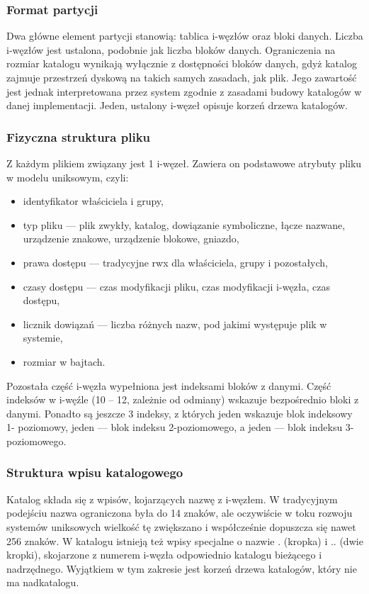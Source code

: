 \documentclass[12pt]{article}
\begin{document}
    \subsubsection{Format partycji}
    Dwa główne element partycji stanowią: tablica i-węzłów oraz bloki danych. Liczba i-węzłów jest ustalona, podobnie jak liczba bloków danych. Ograniczenia na rozmiar katalogu wynikają wyłącznie z dostępności bloków danych, gdyż katalog zajmuje przestrzeń dyskową na takich samych
    zasadach, jak plik. Jego zawartość jest jednak interpretowana przez system zgodnie z zasadami budowy katalogów w danej
    implementacji. Jeden, ustalony i-węzeł opisuje korzeń drzewa katalogów.
    
    \subsubsection{Fizyczna struktura pliku}
    Z każdym plikiem związany jest 1 i-węzeł. Zawiera
    on podstawowe atrybuty pliku w modelu
    uniksowym, czyli:
    \begin{itemize}
        \item identyfikator właściciela i grupy,
        \item typ pliku — plik zwykły, katalog, dowiązanie
        symboliczne, łącze nazwane, urządzenie znakowe,
        urządzenie blokowe, gniazdo,
        \item prawa dostępu — tradycyjne rwx dla właściciela,
        grupy i pozostałych,
        \item czasy dostępu — czas modyfikacji pliku, czas
        modyfikacji i-węzła, czas dostępu,
        \item licznik dowiązań — liczba różnych nazw, pod
        jakimi występuje plik w systemie,
        \item rozmiar w bajtach.
    \end{itemize}
    
    Pozostała część i-węzła wypełniona jest indeksami
    bloków z danymi. Część indeksów w i-węźle (10 –
    12, zależnie od odmiany) wskazuje bezpośrednio
    bloki z danymi. Ponadto są jeszcze 3 indeksy, z
    których jeden wskazuje blok indeksowy 1-
    poziomowy, jeden — blok indeksu 2-poziomowego,
    a jeden — blok indeksu 3-poziomowego.
    
    \subsubsection{Struktura wpisu katalogowego}
    Katalog składa się z wpisów, kojarzących nazwę z i-węzłem. W tradycyjnym podejściu nazwa
    ograniczona była do 14 znaków, ale oczywiście w toku rozwoju systemów uniksowych
    wielkość tę zwiększano i współcześnie dopuszcza się nawet 256 znaków. W katalogu istnieją
    też wpisy specjalne o nazwie . (kropka) i .. (dwie kropki), skojarzone z numerem i-węzła
    odpowiednio katalogu bieżącego i nadrzędnego. Wyjątkiem w tym zakresie jest korzeń drzewa
    katalogów, który nie ma nadkatalogu.
    
\end{document}
